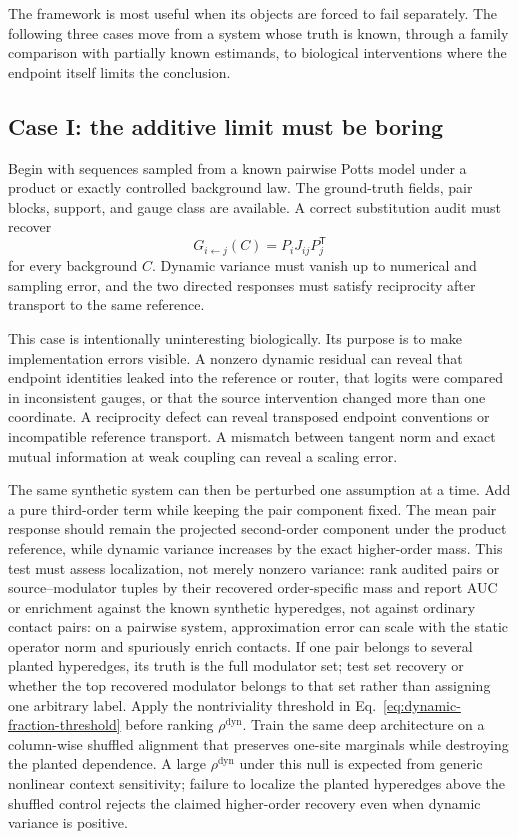 The framework is most useful when its objects are forced to fail separately.  The following three
cases move from a system whose truth is known, through a family comparison with partially known
estimands, to biological interventions where the endpoint itself limits the conclusion.

\subsection*{Case I: the additive limit must be boring}

Begin with sequences sampled from a known pairwise Potts model under a product or exactly controlled
background law.  The ground-truth fields, pair blocks, support, and gauge class are available.  A
correct substitution audit must recover
\begin{equation}
G_{i\leftarrow j}(C)=P_iJ_{ij}P_j^{\mathsf T}
\end{equation}
for every background $C$.  Dynamic variance must vanish up to numerical and sampling error, and the
two directed responses must satisfy reciprocity after transport to the same reference.

This case is intentionally uninteresting biologically.  Its purpose is to make implementation
errors visible.  A nonzero dynamic residual can reveal that endpoint identities leaked into the
reference or router, that logits were compared in inconsistent gauges, or that the source
intervention changed more than one coordinate.  A reciprocity defect can reveal transposed endpoint
conventions or incompatible reference transport.  A mismatch between tangent norm and exact mutual
information at weak coupling can reveal a scaling error.

The same synthetic system can then be perturbed one assumption at a time.  Add a pure third-order
term while keeping the pair component fixed.  The mean pair response should remain the projected
second-order component under the product reference, while dynamic variance increases by the exact
higher-order mass.  This test must assess localization, not merely nonzero variance: rank audited
pairs or source--modulator tuples by their recovered order-specific mass and report AUC or enrichment
against the known synthetic hyperedges, not against ordinary contact pairs: on a pairwise system,
approximation error can scale with the static operator norm and spuriously enrich contacts.  If one
pair belongs to several planted hyperedges, its truth is the full modulator set; test set recovery or
whether the top recovered modulator belongs to that set rather than assigning one arbitrary label.
Apply the nontriviality threshold in Eq.~\ref{eq:dynamic-fraction-threshold} before ranking
$\rho^{\mathrm{dyn}}$.  Train the same deep architecture on a column-wise shuffled
alignment that preserves one-site marginals while destroying the planted dependence.  A large
$\rho^{\mathrm{dyn}}$ under this null is expected from generic nonlinear context sensitivity; failure
to localize the planted hyperedges above the shuffled control rejects the claimed higher-order
recovery even when dynamic variance is positive.

